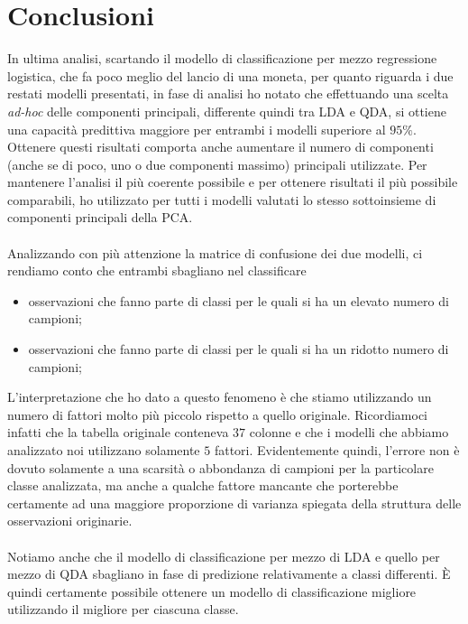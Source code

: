 \documentclass[11pt,a4paper]{article}
\begin{document}
\section{Conclusioni}
In ultima analisi, scartando il modello di classificazione per mezzo regressione
logistica, che fa poco meglio del lancio di una moneta, per quanto riguarda i
due restati modelli presentati, in fase di analisi ho notato che effettuando una
scelta \textit{ad-hoc} delle componenti principali, differente quindi tra LDA e
QDA, si ottiene una capacit\`a predittiva maggiore per entrambi i modelli
superiore al $95\%$. Ottenere questi risultati comporta anche aumentare il
numero di componenti (anche se di poco, uno o due componenti massimo)
principali utilizzate. Per mantenere l'analisi il pi\`u coerente possibile e per
ottenere risultati il pi\`u possibile comparabili, ho utilizzato per tutti i
modelli valutati lo stesso sottoinsieme di componenti principali della PCA.\\
\\
Analizzando con pi\`u attenzione la matrice di confusione dei due modelli, ci
rendiamo conto che entrambi sbagliano nel classificare
\begin{itemize}
	\item osservazioni che fanno parte di classi per le quali si ha un
		elevato numero di campioni;
	\item osservazioni che fanno parte di classi per le quali si ha un
		ridotto numero di campioni;
\end{itemize}
L'interpretazione che ho dato a questo fenomeno \`e che stiamo utilizzando un
numero di fattori molto pi\`u piccolo rispetto a quello originale. Ricordiamoci
infatti che la tabella originale conteneva $37$ colonne e che i modelli che
abbiamo analizzato noi utilizzano solamente $5$ fattori. Evidentemente quindi,
l'errore non \`e dovuto solamente a una scarsit\`a o abbondanza di campioni per
la particolare classe analizzata, ma anche a qualche fattore mancante che
porterebbe certamente ad una maggiore proporzione di varianza spiegata della
struttura delle osservazioni originarie.\\
\\
Notiamo anche che il modello di classificazione per mezzo di LDA e quello per
mezzo di QDA sbagliano in fase di predizione relativamente a classi differenti.
\`E quindi certamente possibile ottenere un modello di classificazione migliore
utilizzando il migliore per ciascuna classe.
\end{document}
